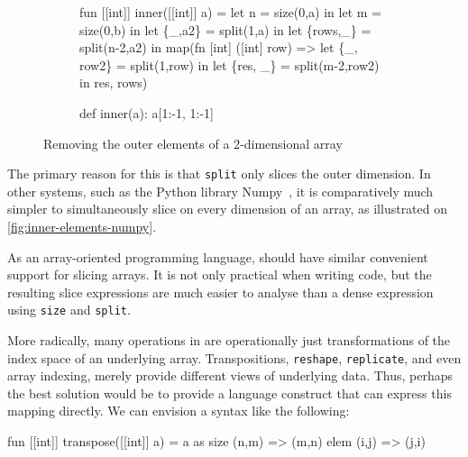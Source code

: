 \begin{figure}
\centering
\begin{subfigure}[t]{.5\textwidth}
\begin{colorcode}
fun [[int]] inner([[int]] a) =
  let n = size(0,a) in
  let m = size(0,b) in
  let \{_,a2\}   = split(1,a) in
  let \{rows,_\} = split(n-2,a2) in
  map(fn [int] ([int] row) =>
        let \{_, row2\} =
          split(1,row) in
        let \{res, _\}  =
          split(m-2,row2) in
        res,
      rows)
\end{colorcode}
\subcaption{\LO{} \label{fig:inner-elements-l0}}
\end{subfigure}\hfill
\begin{subfigure}[t]{.4\textwidth}
\begin{colorcode}
def inner(a):
  a[1:-1, 1:-1]










\end{colorcode}
\end{subfigure}
\caption{Removing the outer elements of a $2$-dimensional array}
\label{fig:inner-elements}
\end{figure}

The primary reason for this is that \texttt{split} only slices the
outer dimension.  In other systems, such as the Python library
Numpy~\cite{oliphant2006guide}, it is comparatively much simpler to
simultaneously slice on every dimension of an array, as illustrated on
\cref{fig:inner-elements-numpy}.

As an array-oriented programming language, \LO{} should have similar
convenient support for slicing arrays.  It is not only practical when
writing code, but the resulting slice expressions are much easier to
analyse than a dense expression using \texttt{size} and
\texttt{split}.

More radically, many operations in \LO{} are operationally just
transformations of the index space of an underlying array.
Transpositions, \texttt{reshape}, \texttt{replicate}, and even array
indexing, merely provide different views of underlying data.  Thus,
perhaps the best solution would be to provide a language construct
that can express this mapping directly.  We can envision a syntax like
the following:

\begin{colorcode}
fun [[int]] transpose([[int]] a) =
   a as
    size (n,m) => (m,n) 
    elem (i,j) => (j,i) 
\end{colorcode}

